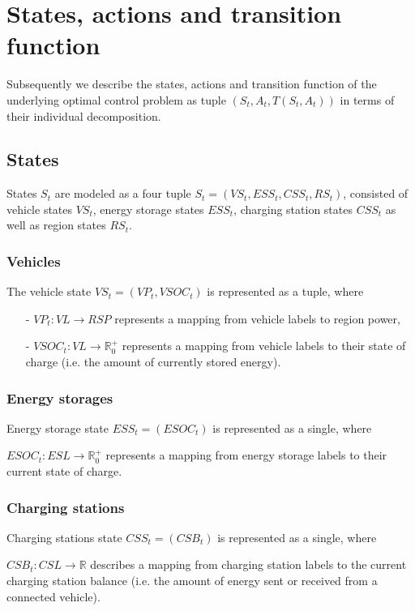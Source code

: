 \section{States, actions and transition function}
Subsequently we describe the states, actions and transition function of the underlying optimal control problem as tuple $(S_t, A_t, T(S_t, A_t))$ in terms of their individual decomposition.

\subsection{States}
States $S_t$ are modeled as a four tuple $
	S_t = (VS_t, ESS_t, CSS_t, RS_t)
$, consisted of vehicle states $VS_t$, energy storage states $ESS_t$, charging station states $CSS_t$ as well as region states $RS_t$.

\subsubsection{Vehicles}
The vehicle state $
	VS_t = (VP_t, VSOC_t)
$ is represented as a tuple, where
\begin{itemize}
	\item[-] $VP_t: VL \rightarrow RSP$ represents a mapping from vehicle labels to region power,
	\item[-] $VSOC_t: VL \rightarrow \mathbb{R}_0^+$ represents a mapping from vehicle labels to their state of charge (i.e. the amount of currently stored energy).
\end{itemize}

\subsubsection{Energy storages}
Energy storage state
$
	ESS_t = (ESOC_t)
$ is represented as a single, where

$ESOC_t: ESL \rightarrow \mathbb{R}_0^+$ represents a mapping from energy storage labels to their current state of charge. 

\subsubsection{Charging stations}
Charging stations state
$
	CSS_t = (CSB_t)
$ is represented as a single, where

$
	CSB_t: CSL \rightarrow \mathbb{R}
$ describes a mapping from charging station labels to the current charging station balance (i.e. the amount of energy sent or received from a connected vehicle).

